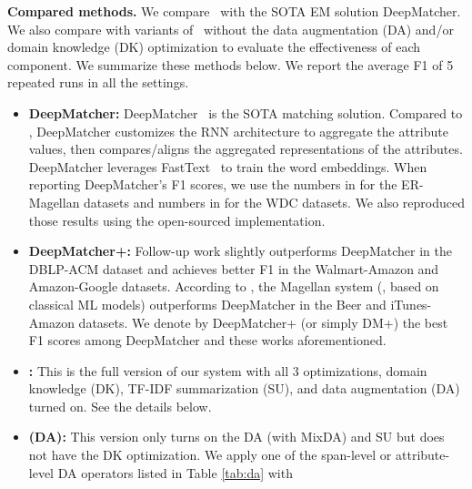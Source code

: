 \smallskip
\noindent
\textbf{Compared methods. } We compare \system\ with the SOTA EM solution DeepMatcher.
We also compare with variants of \system\ without the data augmentation (DA) and/or domain knowledge (DK) 
optimization to evaluate the effectiveness of each component.
We summarize these methods below. We report the average F1 of 5 repeated runs in all the settings.
\vspace{-1mm}
\begin{itemize}\itemsep=0pt\parskip=0.5pt
\item \textbf{DeepMatcher: } DeepMatcher~\cite{Mudgal:2018:DeepMatcher} is the SOTA matching solution. 
Compared to \system, DeepMatcher customizes the RNN architecture to
aggregate the attribute values, then compares/aligns the aggregated representations of 
the attributes. DeepMatcher leverages FastText~\cite{fasttext} to train the word embeddings.
When reporting DeepMatcher's F1 scores, we use the numbers in \cite{Mudgal:2018:DeepMatcher}
for the ER-Magellan datasets and numbers in \cite{Primpeli:2019:WDC} for the WDC datasets.
We also reproduced those results using the open-sourced implementation.
\item \textbf{DeepMatcher+: } Follow-up work \cite{Kasai:2019:LowResourceER} slightly outperforms DeepMatcher in the DBLP-ACM dataset
and \cite{Fu:2019:End2End} achieves better F1 in the Walmart-Amazon and Amazon-Google datasets.
According to \cite{Mudgal:2018:DeepMatcher}, the Magellan system 
(\cite{Konda:2016:Magellan}, based on classical ML models) outperforms DeepMatcher in 
the Beer and iTunes-Amazon datasets. 
We denote by DeepMatcher+ (or simply DM+)
the best F1 scores among DeepMatcher and these works aforementioned.
\item \textbf{\system: } This is the full version of our system with all 3 optimizations,
domain knowledge (DK), TF-IDF summarization (SU), and data augmentation (DA) turned on. See the details below.
\item \textbf{\system (DA): } This version only turns on the DA (with MixDA)
and SU but does not have the DK optimization.
We apply one of the span-level or attribute-level DA operators listed in Table \ref{tab:da} with

\end{itemize}
